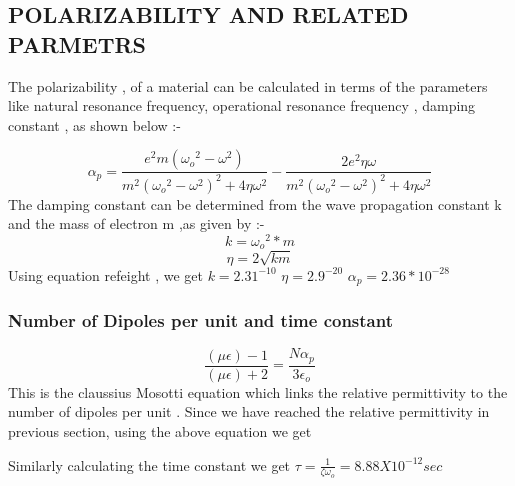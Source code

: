 \documentclass[journal]{IEEEtran}
\begin{document}
\subsection{POLARIZABILITY AND RELATED PARMETRS }

The polarizability , of a material can be calculated in terms of the parameters like natural resonance frequency, operational resonance frequency , damping constant , as shown below \cite{liu2018systemized}:-

\begin{equation} \label{eight}
{\alpha}_p = \dfrac{e^2 m ({\omega_o}^2 - {\omega}^2)}{m^2({\omega_o}^2 - {\omega}^2)^2 + 4 \eta \omega^2} - \dfrac{2 e^2 \eta \omega}{m^2({\omega_o}^2 - {\omega}^2)^2 + 4 \eta \omega^2}
\end{equation}
The damping constant can be determined from the wave propagation constant k and the mass of electron m ,as given by :-
$$k = {\omega_o}^2*m$$
\begin{equation}
\eta = 2 \sqrt{km}
\end{equation}
Using equation ref{eight} , we get 
$k = 2.31^{-10}$
$\eta = 2.9^{-20}$
${\alpha}_p = 2.36*10^{-28}$

\subsubsection{Number of Dipoles per unit and time constant }
\begin{equation} \label{ten}
\dfrac{({\mu \epsilon})- 1}{({\mu \epsilon}) + 2 } = \dfrac{N \alpha_p}{3 \epsilon_o}
\end{equation}
This is the claussius Mosotti  equation which links the relative permittivity to the number of dipoles per unit \cite{Erbium}. Since we have reached the relative permittivity in previous section, using the above equation we get 


Similarly calculating the time constant we get
$ \tau= \frac{1}{\zeta \omega_o} = 8.88 X 10 ^{-12} sec$
\end{document}
